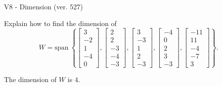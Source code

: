 \begin{exercise}
  \begin{exerciseTitle}V8 - Dimension (ver. 527)\end{exerciseTitle}
  \begin{exerciseStatement}
    Explain how to find the dimension of 
\[W=\mathrm{span}\ \left\{\left[\begin{array}{r}
3 \\
-2 \\
1 \\
-4 \\
0
\end{array}\right] , \left[\begin{array}{r}
2 \\
2 \\
-3 \\
-4 \\
-3
\end{array}\right] , \left[\begin{array}{r}
3 \\
-3 \\
1 \\
2 \\
-3
\end{array}\right] , \left[\begin{array}{r}
-4 \\
0 \\
2 \\
3 \\
-3
\end{array}\right] , \left[\begin{array}{r}
-11 \\
11 \\
-4 \\
-7 \\
3
\end{array}\right]\right\}.\]



  \end{exerciseStatement}
  \begin{exerciseAnswer}
   The dimension of \(W\) is  \(4\).
  


  \end{exerciseAnswer}
\end{exercise}